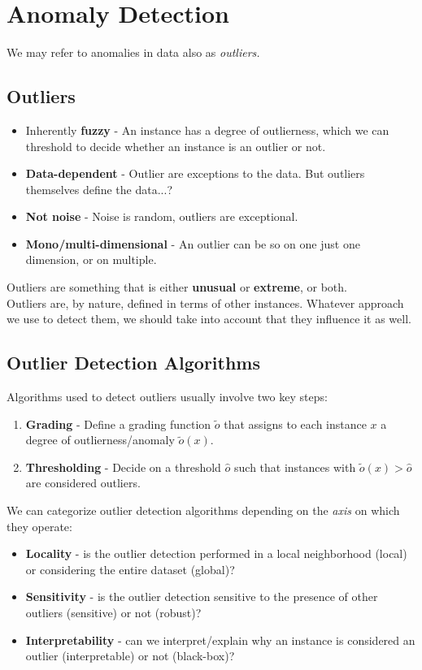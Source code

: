\chapter{Anomaly Detection}

We may refer to anomalies in data also as \textit{outliers.}

\section{Outliers}
\begin{itemize}
	\item Inherently \textbf{fuzzy} - An instance has a degree of outlierness, which we can threshold to decide whether an instance is an outlier or not.
	\item \textbf{Data-dependent} - Outlier are exceptions to the data. But outliers themselves define the data...?
	\item \textbf{Not noise} - Noise is random, outliers are exceptional.
	\item \textbf{Mono/multi-dimensional} - An outlier can be so on one just one dimension, or on multiple.
\end{itemize}

Outliers are something that is either \textbf{unusual} or \textbf{extreme}, or both.\\
Outliers are, by nature, defined in terms of other instances. Whatever approach we use to detect them, we should take into account that they influence it as well.

\section{Outlier Detection Algorithms}
Algorithms used to detect outliers usually involve two key steps:
\begin{enumerate}
   \item \textbf{Grading} - Define a grading function $\tilde{o}$ that assigns to each instance $x$ a degree of outlierness/anomaly $\tilde{o}(x)$.
   \item \textbf{Thresholding} - Decide on a threshold $\hat{o}$ such that instances with $\tilde{o}(x) > \hat{o}$ are considered outliers.
\end{enumerate}

We can categorize outlier detection algorithms depending on the \textit{axis} on which they operate:
\begin{itemize}
   \item \textbf{Locality} - is the outlier detection performed in a local neighborhood (local) or considering the entire dataset (global)?
   \item \textbf{Sensitivity} - is the outlier detection sensitive to the presence of other outliers (sensitive) or not (robust)?
   \item \textbf{Interpretability} - can we interpret/explain why an instance is considered an outlier (interpretable) or not (black-box)?
\end{itemize}

